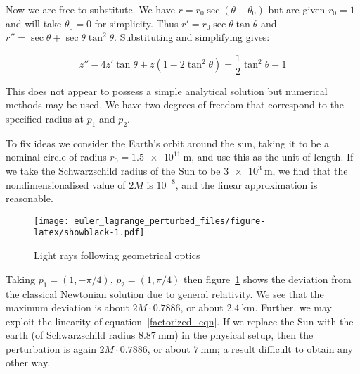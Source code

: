 \documentclass[pdflatex,sn-mathphys-num]{sn-jnl}%
\theoremstyle{thmstyleone}%
\theoremstyle{thmstyletwo}%
\theoremstyle{thmstylethree}%
\begin{document}
Now we are free to substitute.  We have $r=r_0\sec(\theta-\theta_0)$
but are given $r_0=1$ and will take $\theta_0=0$ for simplicity.  Thus
$r'= r_0\sec\theta\tan\theta$ and
$r''=\sec\theta+\sec\theta\tan^2\theta$.  Substituting and simplifying
gives:

\begin{equation}\label{string_ODE}
z'' - 4z'\tan \theta + z(1-2\tan^2\theta) = {\scriptstyle\frac{1}{2}}\tan^2\theta - 1
\end{equation}

This does not appear to possess a simple analytical solution but
numerical methods may be used.  We have two degrees of freedom that
correspond to the specified radius at $p_1$ and $p_2$.

To fix ideas we consider the Earth's orbit around the sun, taking it
to be a nominal circle of radius $r_0 = \qty{1.5e11}{\m}$,
and use this as the unit of length.  If we take the Schwarzschild
radius of the Sun to be $\qty{3e3}{\m}$, we find that the
nondimensionalised value of $2M$ is $10^{-8}$, and the linear
approximation is reasonable.

\begin{figure}[h]
\centering
\texttt{[image: euler\_lagrange\_perturbed\_files/figure-latex/showblack-1.pdf]}
\caption{Light rays following geometrical optics}\label{showblack}
\end{figure}


Taking $p_1=(1,-\pi/4)$, $p_2=(1,\pi/4)$ then figure~\ref{showblack}
shows the deviation from the classical Newtonian solution due to
general relativity.  We see that the maximum deviation is about
$2M\cdot 0.7886$, or about $\qty{2.4}{\km}$.  Further, we may exploit
the linearity of equation~\ref{factorized_eqn}.  If we replace the Sun
with the earth (of Schwarzschild radius $\qty{8.87}{\mm}$) in the
physical setup, then the perturbation is again $2M\cdot 0.7886$, or
about $\qty{7}{\mm}$; a result difficult to obtain any other way.

\end{document}
